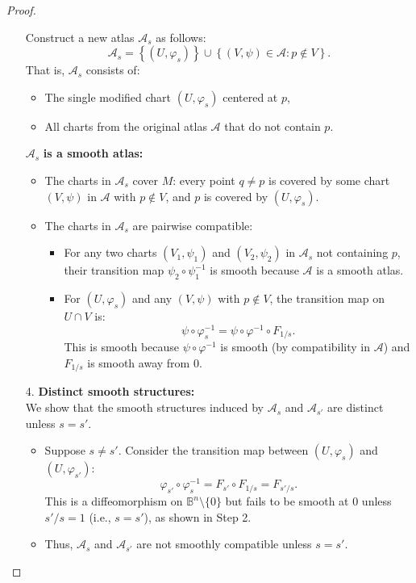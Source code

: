 \begin{problem}
\begin{proof}
\begin{enumerate}
      Construct a new atlas $\mathcal{A}_s$ as follows:
      $$     \mathcal{A}_s = \left\{ (U, \varphi_s) \right\} \cup \left\{ (V, \psi) \in \mathcal{A} \colon p \notin V \right\}.     $$
      That is, $\mathcal{A}_s$ consists of:
      
  \begin{itemize}
        \item The single modified chart $(U, \varphi_s)$ centered at $p$,
        \item All charts from the original atlas $\mathcal{A}$ that do not contain $p$.
      \end{itemize}
  
      $\mathcal{A}_s$ \textbf{is a smooth atlas:}
      
  \begin{itemize}
        \item The charts in $\mathcal{A}_s$ cover $M$: every point $q \neq p$ is covered by some chart $(V, \psi)$ in $\mathcal{A}$ with $p \notin V$, and $p$ is covered by $(U, \varphi_s)$.
        \item The charts in $\mathcal{A}_s$ are pairwise compatible:
        \begin{itemize}
          \item For any two charts $(V_1, \psi_1)$ and $(V_2, \psi_2)$ in $\mathcal{A}_s$ not containing $p$, their transition map $\psi_2 \circ \psi_1^{-1}$ is smooth because $\mathcal{A}$ is a smooth atlas.
          \item For $(U, \varphi_s)$ and any $(V, \psi)$ with $p \notin V$, the transition map on $U \cap V$ is:
          $$
          \psi \circ \varphi_s^{-1} = \psi \circ \varphi^{-1} \circ F_{1/s}.
          $$
          This is smooth because $\psi \circ \varphi^{-1}$ is smooth (by compatibility in $\mathcal{A}$) and $F_{1/s}$ is smooth away from $0$.
        \end{itemize}
      \end{itemize}
  
      \item[4.] \textbf{Distinct smooth structures:} \\
      We show that the smooth structures induced by $\mathcal{A}_s$ and $\mathcal{A}_{s'}$ are distinct unless $s = s'$.
  
      
  \begin{itemize}
        \item Suppose $s \neq s'$. Consider the transition map between $(U, \varphi_s)$ and $(U, \varphi_{s'})$:
        $$
        \varphi_{s'} \circ \varphi_s^{-1} = F_{s'} \circ F_{1/s} = F_{s'/s}.
        $$
        This is a diffeomorphism on $\mathbb{B}^n \setminus \{0\}$ but fails to be smooth at $0$ unless $s'/s = 1$ (i.e., $s = s'$), as shown in Step 2.
        \item Thus, $\mathcal{A}_s$ and $\mathcal{A}_{s'}$ are not smoothly compatible unless $s = s'$.
      \end{itemize}
  

\end{enumerate}
\end{proof}
\end{problem}
